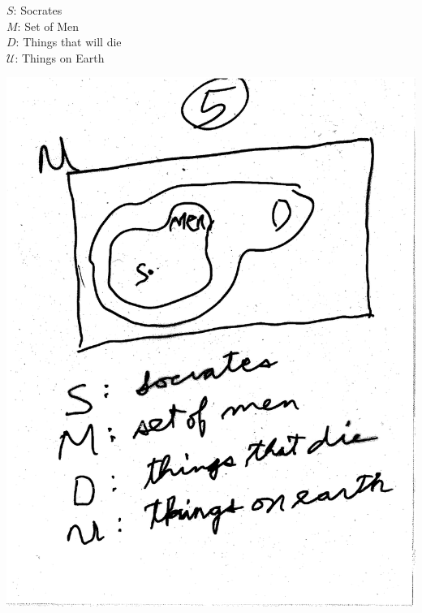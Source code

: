 \documentclass[10pt,a4paper]{article}
\begin{document}
$S$: Socrates\\
$M$: Set of Men\\
$D$: Things that will die\\
$\mathcal{U}$: Things on Earth

\includegraphics[scale=.5]{Pages/ST_5} 





\end{document}
